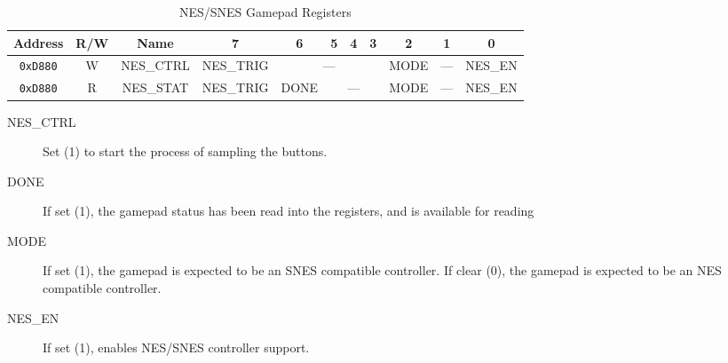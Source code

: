 \begin{table}[ht]
    \begin{center}
        \begin{tabular}{|c|c|c|c|c|c|c|c|c|c|c|} \hline
            Address & R/W & Name & 7 & 6 & 5 & 4 & 3 & 2 & 1 & 0 \\\hline\hline
            \verb+0xD880+ & W & NES\_CTRL & NES\_TRIG & \multicolumn{4}{|c|}{---} & MODE & --- & NES\_EN \\ \hline
            \verb+0xD880+ & R & NES\_STAT & NES\_TRIG & DONE & \multicolumn{3}{|c|}{---} & MODE & --- & NES\_EN \\ \hline
        \end{tabular}
    \end{center}
    \caption{NES/SNES Gamepad Registers}
    \label{tab:nes_registers}
\end{table}

\begin{description}
    \item[NES\_CTRL] Set (1) to start the process of sampling the buttons.
    \item[DONE] If set (1), the gamepad status has been read into the registers, and is available for reading
    \item[MODE] If set (1), the gamepad is expected to be an SNES compatible controller. If clear (0), the gamepad is expected to be an NES compatible controller.
    \item[NES\_EN] If set (1), enables NES/SNES controller support.
\end{description}

